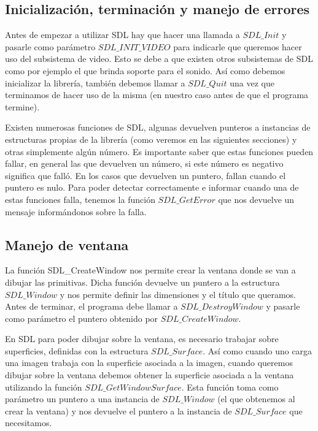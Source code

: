\documentclass[a4paper]{article}
\begin{document}
\subsection{Inicialización, terminación y manejo de errores}
Antes de empezar a utilizar SDL hay que hacer una llamada a $SDL\_Init$ y pasarle como parámetro $SDL\_INIT\_VIDEO$ para indicarle que queremos hacer uso del subsistema de video. Esto se debe a que existen otros subsistemas de SDL como por ejemplo el que brinda soporte para el sonido. Así como debemos inicializar la librería, también debemos llamar a $SDL\_Quit$ una vez que terminamos de hacer uso de la misma (en nuestro caso antes de que el programa termine).
\par Existen numerosas funciones de SDL, algunas devuelven punteros a instancias de estructuras propias de la librería (como veremos en las siguientes secciones) y otras simplemente algún número. Es importante saber que estas funciones pueden fallar, en general las que devuelven un número, si este número es negativo significa que falló. En los casos que devuelven un puntero, fallan cuando el puntero es nulo. Para poder detectar correctamente e informar cuando una de estas funciones falla, tenemos la función $SDL\_GetError$ que nos devuelve un mensaje informándonos sobre la falla.
\subsection{Manejo de ventana}
La función SDL_CreateWindow nos permite crear la ventana donde se van a dibujar las primitivas. Dicha función devuelve un puntero a la estructura $SDL\_Window$ y nos permite definir las dimensiones y el título que queramos. Antes de terminar, el programa debe llamar a $SDL\_DestroyWindow$ y pasarle como parámetro el puntero obtenido por $SDL\_CreateWindow$.
\par En SDL para poder dibujar sobre la ventana, es necesario trabajar sobre superficies, definidas con la estructura $SDL\_Surface$. Así como cuando uno carga una imagen trabaja con la superficie asociada a la imagen, cuando queremos dibujar sobre la ventana debemos obtener la superficie asociada a la ventana utilizando la función $SDL\_GetWindowSurface$. Esta función toma como parámetro un puntero a una instancia de $SDL\_Window$ (el que obtenemos al crear la ventana) y nos devuelve el puntero a la instancia de $SDL\_Surface$ que necesitamos.
\end{document}
